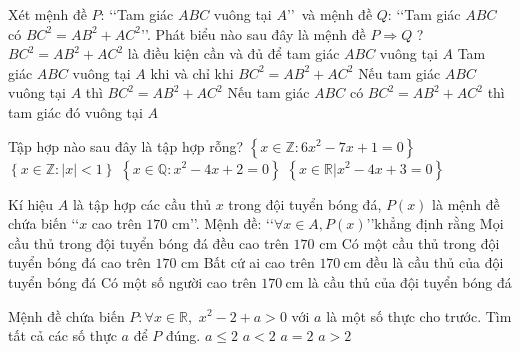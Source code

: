 \begin{ex}%
Xét mệnh đề $P$: \lq\lq Tam giác $A B C$ vuông tại $A$\rq\rq ~và mệnh đề $Q$: \lq\lq Tam giác $A B C$ có $B C^2=A B^2+A C^2$\rq\rq. Phát biểu nào sau đây là mệnh đề $P \Rightarrow Q$ ?
\choice
{$B C^2=A B^2+A C^2$ là điều kiện cần và đủ để tam giác $A B C$ vuông tại $A$}
{Tam giác $A B C$ vuông tại $A$ khi và chỉ khi $B C^2=A B^2+A C^2$}
{\True Nếu tam giác $A B C$ vuông tại $A$ thì $B C^2=A B^2+A C^2$}
{Nếu tam giác $A B C$ có $B C^2=A B^2+A C^2$ thì tam giác đó vuông tại $A$}
\end{ex}

\begin{ex}%
Tập hợp nào sau đây là tập hợp rỗng?
\choice
{ $\left\{ x\in \mathbb{Z}: 6x^2-7x+1=0 \right\}$}
{ $\left\{ x\in \mathbb{Z}: | x |<1  \right\}$}
{ \True $\left\{ x\in \mathbb{Q}: x^2-4x+2=0  \right\}$}
{ $\left\{ x\in \mathbb{R}\big| x^2-4x+3=0  \right\}$}
\end{ex}

\begin{ex}%
Kí hiệu $A$ là tập hợp các cầu thủ $x$ trong đội tuyển bóng đá, $P(x)$ là mệnh đề chứa biến \lq\lq$x$ cao trên $170$ cm\rq\rq. Mệnh đề: \lq\lq$\forall x\in A, P(x)$\rq\rq\quad khẳng định rằng
\choice
{\True Mọi cầu thủ trong đội tuyển bóng đá đều cao trên $170$ cm}
{Có một cầu thủ trong đội tuyển bóng đá cao trên $170$ cm}
{Bất cứ ai cao trên $170\mathrm{~cm}$ đều là cầu thủ của đội tuyển bóng đá}
{Có một số người cao trên $170\mathrm{~cm}$ là cầu thủ của đội tuyển bóng đá}
\end{ex}

\begin{ex}%
Mệnh đề chứa biến  $P:\forall x \in \mathbb{R},\,\,{x^2} - 2 + a > 0$ với $ a $ là một số thực cho trước. Tìm tất cả các số thực $ a $  để  $ P $ đúng.
\choice
{ $a \le 2$ }
{$a < 2$  }
{ $a = 2$ }
{\True $a > 2$ }
\end{ex}

